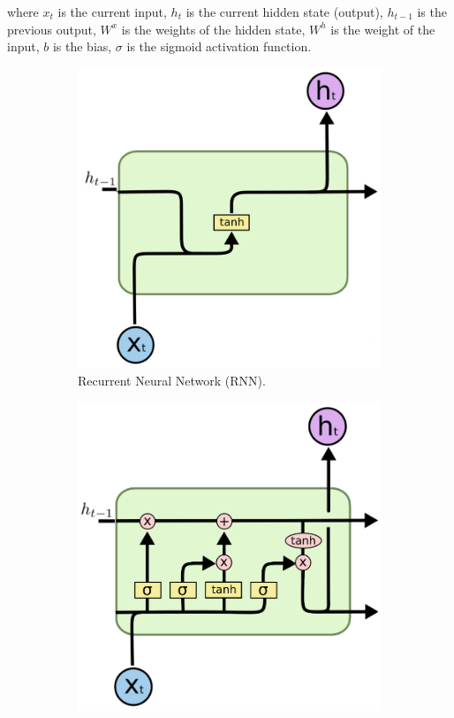 \noindent
where $x_t$ is the current input, $h_t$ is the current hidden state (output), $h_{t-1}$ is the previous output, $W^x$ is the weights of the hidden state, $W^h$ is the weight of the input, $b$ is the bias, $\sigma$ is the sigmoid activation function.

\begin{figure}[h]
    \centering
    \begin{subfigure}[t]{0.3\textwidth}
      \includegraphics[width=\linewidth]{imgs/models/rnn-2.png}
      \caption{Recurrent Neural Network (RNN).} \label{fig:rnn}
    \end{subfigure}%
    \hspace{1em}%
    \begin{subfigure}[t]{0.3\textwidth}
      \includegraphics[width=\linewidth]{imgs/models/lstm-2.png}

\end{subfigure}
\end{figure}
